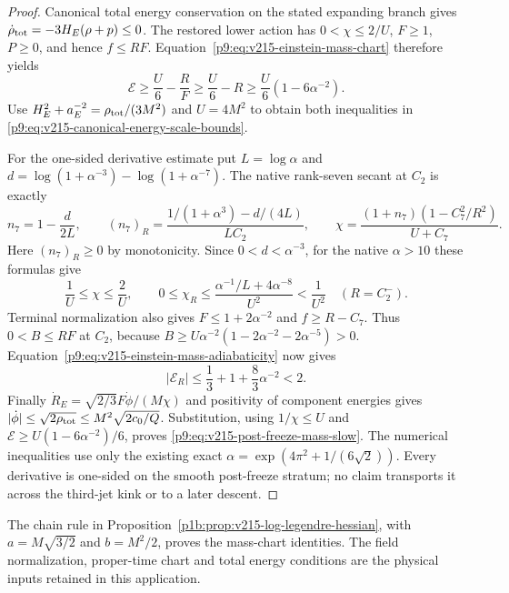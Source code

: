 \documentclass[12pt,a4paper]{article}
\begin{document}
\begin{proof}
Canonical total energy conservation on the stated expanding branch gives
$\dot\rho_{\rm tot}=-3H_E(\rho+p)\le0$. The restored lower action has
$0<\chi\le2/U$, $F\ge1$, $P\ge0$, and hence $f\le RF$.
Equation~\eqref{p9:eq:v215-einstein-mass-chart} therefore yields
\[
 \mathcal E\ge\frac U6-\frac R F
             \ge\frac U6-R
             \ge\frac U6(1-6\alpha^{-2}).
\]
Use $H_E^2+a_E^{-2}=\rho_{\rm tot}/(3M^2)$ and $U=4M^2$
to obtain both inequalities in
\eqref{p9:eq:v215-canonical-energy-scale-bounds}.

For the one-sided derivative estimate put $L=\log\alpha$ and
$d=\log(1+\alpha^{-3})-\log(1+\alpha^{-7})$. The native rank-seven
secant at $C_2$ is exactly
\[
 n_7=1-\frac d{2L},\qquad
 (n_7)_R=\frac{1/(1+\alpha^3)-d/(4L)}{LC_2},\qquad
 \chi=\frac{(1+n_7)(1-C_7^2/R^2)}{U+C_7}.
\]
Here $(n_7)_R\ge0$ by monotonicity. Since $0<d<\alpha^{-3}$,
for the native $\alpha>10$ these formulas give
\[
 \frac1U\le\chi\le\frac2U,\qquad
 0\le\chi_R\le
 \frac{\alpha^{-1}/L+4\alpha^{-8}}{U^2}<\frac1{U^2}
 \quad(R=C_2^-).
\]
Terminal normalization also gives $F\le1+2\alpha^{-2}$ and
$f\ge R-C_7$. Thus $0<B\le RF$ at $C_2$, because
$B\ge U\alpha^{-2}(1-2\alpha^{-2}-2\alpha^{-5})>0$.
Equation~\eqref{p9:eq:v215-einstein-mass-adiabaticity} now gives
\[
 |\mathcal E_R|\le\frac13+1+\frac83\alpha^{-2}<2.
\]
Finally $\dot R_E=\sqrt{2/3}F\dot\phi/(M\chi)$ and positivity of
component energies gives
$|\dot\phi|\le\sqrt{2\rho_{\rm tot}}
\le M^2\sqrt{2c_0/Q}$. Substitution, using $1/\chi\le U$ and
$\mathcal E\ge U(1-6\alpha^{-2})/6$, proves
\eqref{p9:eq:v215-post-freeze-mass-slow}. The numerical inequalities
use only the existing exact $\alpha=\exp(4\pi^2+1/(6\sqrt2))$.
Every derivative is one-sided on the smooth post-freeze stratum; no
claim transports it across the third-jet kink or to a later descent.
\end{proof}

The chain rule in
Proposition~\ref{p1b:prop:v215-log-legendre-hessian}, with
$a=M\sqrt{3/2}$ and $b=M^2/2$, proves the mass-chart identities.
The field normalization, proper-time chart and total energy conditions
are the physical inputs retained in this application.
\end{document}
